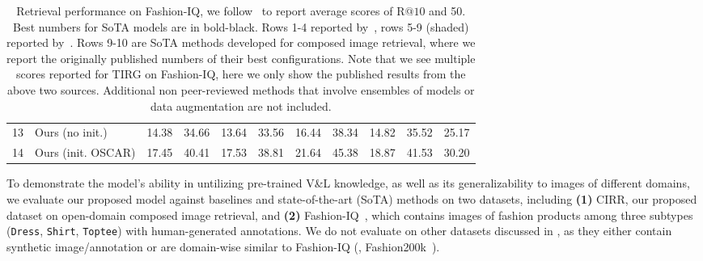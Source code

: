 \documentclass[10pt,twocolumn,letterpaper]{article}
\makeatletter
\renewcommand{\paragraph}{\@startsection{paragraph}{4}{\z@}{1.05ex \@plus 1ex \@minus .2ex}{-1em}{\normalfont\normalsize\bfseries}}
\newcommand{\dstname}{CIRR\xspace}
\makeatother
\begin{document}
\begin{table*}[!ht]
{\begin{tabular}{llrrrrrrrrr}
  \midrule
  13 & Ours (no init.)    &14.38   & 34.66     & 13.64 & 33.56     & 16.44  & 38.34   & 14.82 & 35.52 & 25.17  \\ 
  14 & Ours (init. OSCAR) &17.45   & 40.41     & 17.53 & 38.81     & 21.64  & 45.38   & 18.87 & 41.53 & 30.20   \\ 

  \bottomrule
  \end{tabular}}
  \caption{Retrieval performance on Fashion-IQ, we follow~\cite{fashioniq} to report average scores of R$@10$ and 50. Best numbers for SoTA models are in bold-black. Rows 1-4 reported by~\cite{fashioniq}, rows 5-9 (shaded) reported by~\cite{chen2020image_val}. Rows 9-10 are SoTA methods developed for composed image retrieval, where we report the originally published numbers of their best configurations. Note that we see multiple scores reported for TIRG on Fashion-IQ, here we only show the published results from the above two sources. Additional non peer-reviewed methods that involve ensembles of models or data augmentation are not included.}
  \label{tab:baseline_1}
\end{table*}

\paragraph{Datasets.}
To demonstrate the model's ability in untilizing pre-trained V\&L knowledge, as well as its generalizability to images of different domains, we evaluate our proposed model against baselines and state-of-the-art (SoTA) methods on two datasets, including \textbf{(1)} \dstname, our proposed dataset on open-domain composed image retrieval, and \textbf{(2)} Fashion-IQ~\cite{fashioniq}, which contains images of fashion products among three subtypes (\texttt{Dress}, \texttt{Shirt}, \texttt{Toptee}) with human-generated annotations. We do not evaluate on other datasets discussed in , as they either contain synthetic image/annotation or are domain-wise similar to Fashion-IQ (\eg, Fashion200k~\cite{han2017automatic_fashion200k}).
\end{document}
